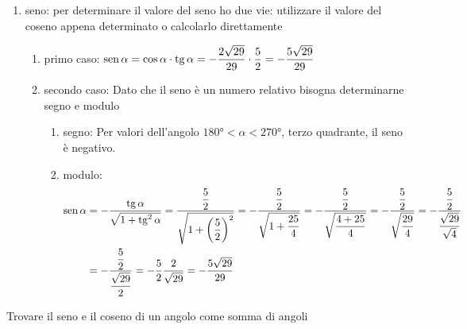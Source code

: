 {\begin{table}[H]
\begin{enumerate}
\begin{enumerate}
\begin{enumerate}
\begin{align*}
			=-\dfrac{1}{\sqrt{\dfrac{4+25}{4}}}=-\dfrac{1}{\sqrt{\dfrac{29}{4}}}\\
			&=-\dfrac{1}{\dfrac{\sqrt{29}}{\sqrt{4}}}=-\dfrac{1}{\dfrac{\sqrt{29}}{2}}=-\dfrac{2}{\sqrt{29}}=-\dfrac{2\sqrt{29}}{29}
			\end{align*}
		\end{enumerate}
		\item seno: per determinare il valore del seno ho due vie: utilizzare il valore del coseno appena determinato o calcolarlo direttamente 
		\begin{enumerate}
			\item primo caso: $\operatorname{sen}\alpha=\cos\alpha\cdot\operatorname{tg}\alpha=-\dfrac{2\sqrt{29}}{29}\cdot\dfrac{5}{2}=-\dfrac{5\sqrt{29}}{29}$
			\item secondo caso: Dato che il seno è un numero relativo bisogna determinarne segno e modulo
			\begin{enumerate}
				\item segno:  Per valori dell'angolo  $\ang{180}<\alpha<\ang{270}$, terzo quadrante, il seno è negativo.
				\item modulo:
				\begin{align*}
				\operatorname{sen}\alpha&=-\dfrac{\operatorname{tg}\alpha}{\sqrt{1+\operatorname{tg}^2\alpha}}
				=\dfrac{\dfrac{5}{2}}{\sqrt{1+\left(\dfrac{5}{2}\right)^2}}
				=-\dfrac{\dfrac{5}{2}}{\sqrt{1+\dfrac{25}{4}}}
				=-\dfrac{\dfrac{5}{2}}{\sqrt{\dfrac{4+25}{4}}}
				=-\dfrac{\dfrac{5}{2}}{\sqrt{\dfrac{29}{4}}}
				=-\dfrac{\dfrac{5}{2}}{\dfrac{\sqrt{29}}{\sqrt{4}}}\\
				&=-\dfrac{\dfrac{5}{2}}{\dfrac{\sqrt{29}}{2}}
				=-\dfrac{5}{2}\dfrac{2}{\sqrt{29}}
				=-\dfrac{5\sqrt{29}}{29}
				\end{align*} %
			\end{enumerate}
		\end{enumerate}
	\end{enumerate}
\end{enumerate}
\end{table}
\begin{table}[H]
	\caption{Trovare il seno e il coseno di un angolo come somma di angoli}
	\label{tab:Trovaresenocosenonotatangenteangolo}

\end{table}}
